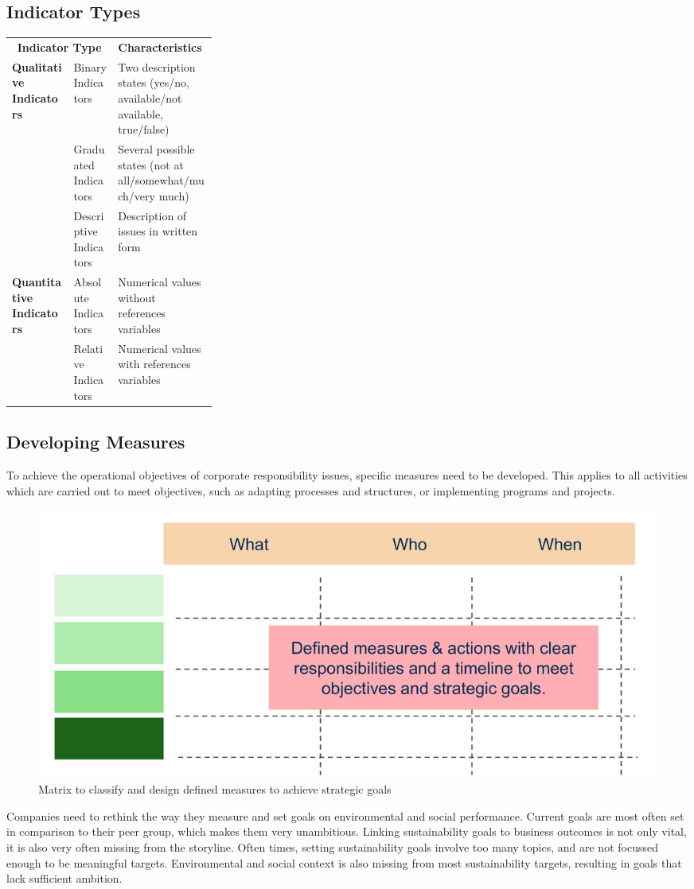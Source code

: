 \documentclass[11pt]{article}
\theoremstyle{definition}
\begin{document}
\subsection{Indicator Types}
\begin{tabularx}{\linewidth}{p{0.3\linewidth} X X}
	\multicolumn{2}{c}{\cellcolor{DodgerBlue1!40} \textbf{Indicator Type}} & \cellcolor{DodgerBlue1!40} \textbf{Characteristics}\\
	\multirow{3}{*}{\textbf{Qualitative Indicators}} & Binary Indicators & Two description states (yes/no, available/not available, true/false)\\
	& Graduated Indicators & Several possible states (not at all/somewhat/much/very much)\\
	& Descriptive Indicators & Description of issues in written form\\
	\multirow{2}{*}{\textbf{Quantitative Indicators}} & Absolute Indicators & Numerical values without references variables\\
	& Relative Indicators & Numerical values with references variables\\
\end{tabularx}

\subsection{Developing Measures}
To achieve the operational objectives of corporate responsibility issues, specific measures need to be developed. This applies to all activities which are carried out to meet objectives, such as adapting processes and structures, or implementing programs and projects.
\begin{figure}[H]
	\centering
	\includegraphics[width=0.7\linewidth]{img/developing_achievable_measures}
	\caption{Matrix to classify and design defined measures to achieve strategic goals}
	\label{fig:developingachievablemeasures}
\end{figure}
Companies need to rethink the way they measure and set goals on environmental and social performance. Current goals are most often set in comparison to their peer group, which makes them very unambitious. Linking sustainability goals to business outcomes is not only vital, it is also very often missing from the storyline. Often times, setting sustainability goals involve too many topics, and are not focussed enough to be meaningful targets. Environmental and social context is also missing from most sustainability targets, resulting in goals that lack sufficient ambition.
\end{document}
